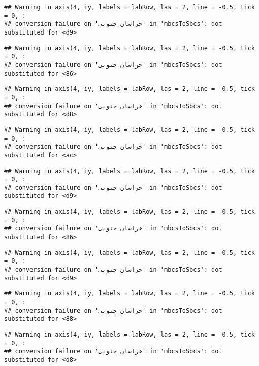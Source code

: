 \documentclass[
]{article}
\begin{document}
\begin{verbatim}
## Warning in axis(4, iy, labels = labRow, las = 2, line = -0.5, tick = 0, :
## conversion failure on 'خراسان جنوبی' in 'mbcsToSbcs': dot substituted for <d9>
\end{verbatim}

\begin{verbatim}
## Warning in axis(4, iy, labels = labRow, las = 2, line = -0.5, tick = 0, :
## conversion failure on 'خراسان جنوبی' in 'mbcsToSbcs': dot substituted for <86>
\end{verbatim}

\begin{verbatim}
## Warning in axis(4, iy, labels = labRow, las = 2, line = -0.5, tick = 0, :
## conversion failure on 'خراسان جنوبی' in 'mbcsToSbcs': dot substituted for <d8>
\end{verbatim}

\begin{verbatim}
## Warning in axis(4, iy, labels = labRow, las = 2, line = -0.5, tick = 0, :
## conversion failure on 'خراسان جنوبی' in 'mbcsToSbcs': dot substituted for <ac>
\end{verbatim}

\begin{verbatim}
## Warning in axis(4, iy, labels = labRow, las = 2, line = -0.5, tick = 0, :
## conversion failure on 'خراسان جنوبی' in 'mbcsToSbcs': dot substituted for <d9>
\end{verbatim}

\begin{verbatim}
## Warning in axis(4, iy, labels = labRow, las = 2, line = -0.5, tick = 0, :
## conversion failure on 'خراسان جنوبی' in 'mbcsToSbcs': dot substituted for <86>
\end{verbatim}

\begin{verbatim}
## Warning in axis(4, iy, labels = labRow, las = 2, line = -0.5, tick = 0, :
## conversion failure on 'خراسان جنوبی' in 'mbcsToSbcs': dot substituted for <d9>
\end{verbatim}

\begin{verbatim}
## Warning in axis(4, iy, labels = labRow, las = 2, line = -0.5, tick = 0, :
## conversion failure on 'خراسان جنوبی' in 'mbcsToSbcs': dot substituted for <88>
\end{verbatim}

\begin{verbatim}
## Warning in axis(4, iy, labels = labRow, las = 2, line = -0.5, tick = 0, :
## conversion failure on 'خراسان جنوبی' in 'mbcsToSbcs': dot substituted for <d8>
\end{verbatim}
\end{document}
